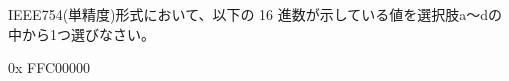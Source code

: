 IEEE754(単精度)形式において、以下の 16 進数が示している値を選択肢a〜dの中から1つ選びなさい。

\bigskip
\begin{center}
0x FFC00000
\end{center}
